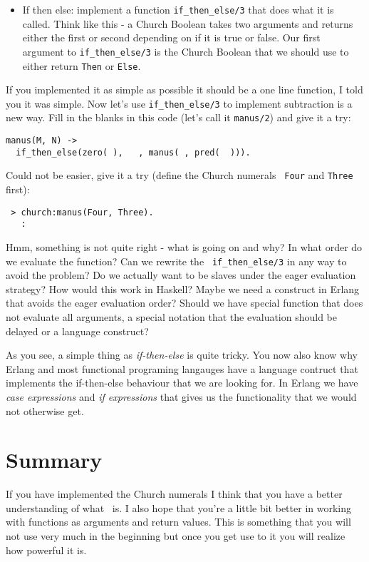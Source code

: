 \documentclass[a4paper,11pt]{article}
\begin{document}
\begin{itemize}
\item If then else: implement a function {\tt if_then_else/3} that
  does what it is called. Think like this - a Church Boolean takes two
  arguments and returns either the first or second depending on if it
  is true or false. Our first argument to {\tt if_then_else/3} is the
  Church Boolean that we should use to either return {\tt Then} or {\tt Else}. 
\end{itemize}

If you implemented it as simple as possible it should be a one line
function, I told you it was simple. Now let's use {\tt if_then_else/3}
to implement subtraction is a new way. Fill in the blanks in this code
(let's call it {\tt manus/2}) and give it a try:

\begin{verbatim}
manus(M, N) -> 
  if_then_else(zero( ),   , manus( , pred(  ))).
\end{verbatim}

Could not be easier, give it a try (define the Church numerals {\tt
  Four} and {\tt Three} first):

\begin{verbatim}
 > church:manus(Four, Three).
   :
\end{verbatim}

Hmm, something is not quite right - what is going on and why? In what
order do we evaluate the function?  Can we rewrite the {\tt
  if_then_else/3} in any way to avoid the problem? Do we actually want
to be slaves under the eager evaluation strategy? How would this work
in Haskell?  Maybe we need a construct in Erlang that avoids the eager
evaluation order? Should we have special function that does not
evaluate all arguments, a special notation that the evaluation should
be delayed or a language construct?

As you see, a simple thing as {\em if-then-else} is quite tricky. You
now also know why Erlang and most functional programing langauges have
a language contruct that implements the if-then-else behaviour that we
are looking for. In Erlang we have {\em case expressions} and {\em if
  expressions} that gives us the functionality that we would not
otherwise get.

\section{Summary}

If you have implemented the Church numerals I think that you have a
better understanding of what \lamc\ is. I also hope that you're a
little bit better in working with functions as arguments and return
values. This is something that you will not use very much in the
beginning but once you get use to it you will realize how powerful it
is.
\end{document}
